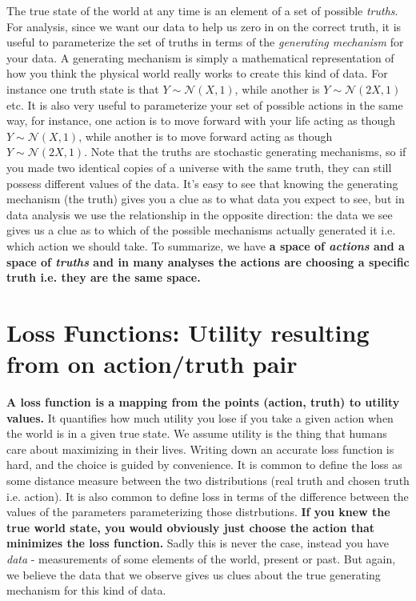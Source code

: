The true state of the world at any time is an element of a set of possible \emph{truths}. For analysis, since we want our data to help us zero in on the correct truth, it is useful to parameterize the set of truths in terms of the \emph{generating mechanism} for your data. A generating mechanism is simply a mathematical representation of how you think the physical world really works to create this kind of data. For instance one truth state is that $Y\sim \mathcal{N}(X,1)$, while another is $Y\sim \mathcal{N}(2X, 1)$ etc. It is also very useful to parameterize your set of possible actions in the same way, for instance, one action is to move forward with your life acting as though $Y\sim \mathcal{N}(X,1)$, while another is to move forward acting as though $Y\sim \mathcal{N}(2X, 1)$. Note that the truths are stochastic generating mechanisms, so if you made two identical copies of a universe with the same truth, they can still possess different values of the data. It's easy to see that knowing the generating mechanism (the truth) gives you a clue as to what data you expect to see, but in data analysis we use the relationship in the opposite direction: the data we see gives us a clue as to which of the possible mechanisms actually generated it i.e. which action we should take. To summarize, we have \textbf{a space of \emph{actions} and a space of \emph{truths} and in many analyses the actions are choosing a specific truth i.e. they are the same space.} 
\n
 
 \section{Loss Functions: Utility resulting from on action/truth pair}
\textbf{A loss function is a mapping from the points (action, truth) to utility values.} It quantifies how much utility you lose if you take a given action when the world is in a given true state. We assume utility is the thing that humans care about maximizing in their lives. Writing down an accurate loss function is hard, and the choice is guided by convenience. It is common to define the loss as some distance measure between the two distributions (real truth and chosen truth i.e. action). It is also common to define loss in terms of the difference between the values of the parameters parameterizing those distrbutions. \textbf{If you knew the true world state, you would obviously just choose the action that minimizes the loss function.} Sadly this is never the case, instead you have \emph{data} - measurements of some elements of the world, present or past. But again, we believe the data that we observe gives us clues about the true generating mechanism for this kind of data.
\n

